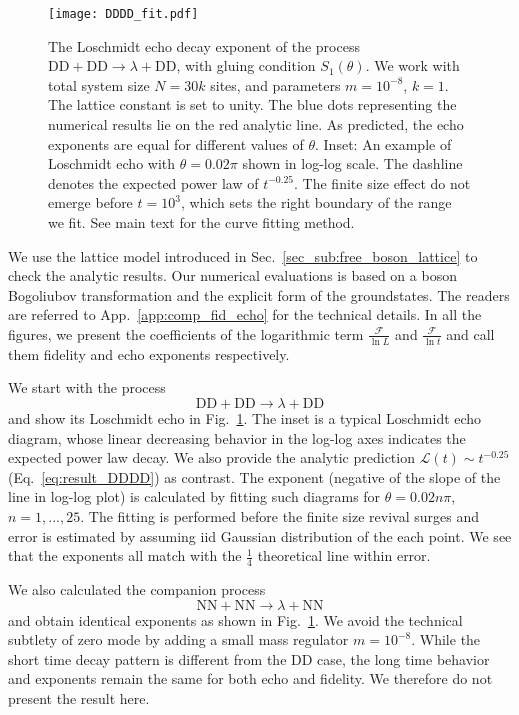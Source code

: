 \begin{figure}[h]
\texttt{[image: DDDD\_fit.pdf]}
\caption{The Loschmidt echo decay exponent of the process $\text{DD}+\text{DD}\rightarrow\lambda+\text{DD}$, with gluing condition $S_1(\theta)$. We work with total system size $N = 30k$ sites, and parameters $m = 10^{-8}$, $k = 1$. The lattice constant is set to unity. The blue dots representing the numerical results lie on the red analytic line. As predicted, the echo exponents are equal for different values of $\theta$. Inset: An example of Loschmidt echo with $\theta = 0.02 \pi$ shown in log-log scale. The dashline denotes the expected power law of $t^{-0.25}$. The finite size effect do not emerge before $t=10^{3}$, which sets the right boundary of the range we fit. See main text for the curve fitting method.}
\label{fig:DDDD}
\end{figure}

We use the lattice model introduced in Sec.~\ref{sec_sub:free_boson_lattice} to check the analytic results. Our numerical evaluations is based on a boson Bogoliubov transformation and the explicit form of the groundstates. The readers are referred to App.~\ref{app:comp_fid_echo} for the technical details. In all the figures, we present the coefficients of the logarithmic term $\frac{\mathcal{F}}{\ln L}$ and $\frac{\mathcal{F} }{\ln t}$ and call them fidelity and echo exponents respectively. 

We start with the process
\begin{equation}
\text{DD}+\text{DD}\rightarrow\lambda+\text{DD}
\end{equation}
and show its Loschmidt echo in Fig.~\ref{fig:DDDD}. The inset is a typical Loschmidt echo diagram, whose linear decreasing behavior in the log-log axes indicates the expected power law decay. We also provide the analytic prediction $\mathcal{L}(t)\sim t^{-0.25}$ (\cf Eq.~\eqref{eq:result_DDDD}) as contrast. The exponent (negative of the slope of the line in log-log plot) is calculated by fitting such diagrams for $\theta = 0.02n \pi$, $n = 1,...,25 $. The fitting is performed before the finite size revival surges and error is estimated by assuming iid Gaussian distribution of the each point. We see that the exponents all match with the $\frac{1}{4}$ theoretical line within error. 

We also calculated the companion process
\begin{equation}
 \text{NN}+\text{NN}\rightarrow\lambda+\text{NN}
\end{equation}
and obtain identical exponents as shown in Fig.~\ref{fig:DDDD}. We avoid the technical subtlety of zero mode by adding a small mass regulator $m=10^{-8}$. While the short time decay pattern is different from the DD case, the long time behavior and exponents remain the same for both echo and fidelity. We therefore do not present the result here. 

